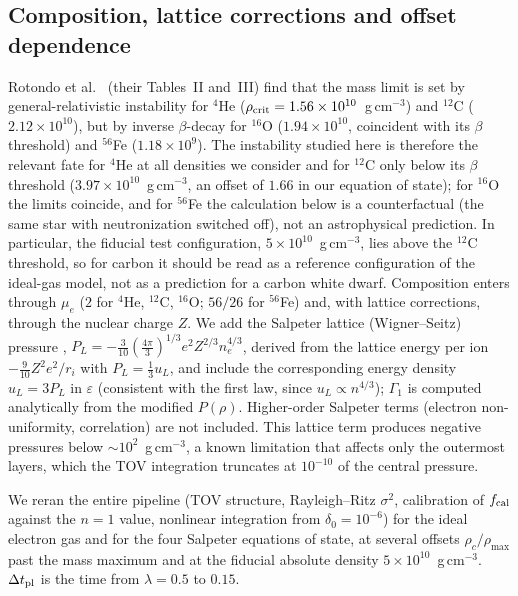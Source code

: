 \documentclass[11pt]{article}
\begin{document}
\subsection{Composition, lattice corrections and offset dependence}
\label{sec:composition}

Rotondo et al.\ \citep{RotondoRRX2011} (their Tables~II and~III) find that the mass limit is set by general-relativistic instability for $^{4}$He ($\rho_{\rm crit}=1.56\times10^{10}$~g\,cm$^{-3}$) and $^{12}$C ($2.12\times10^{10}$), but by inverse $\beta$-decay for $^{16}$O ($1.94\times10^{10}$, coincident with its $\beta$ threshold) and $^{56}$Fe ($1.18\times10^{9}$). The instability studied here is therefore the relevant fate for $^{4}$He at all densities we consider and for $^{12}$C only below its $\beta$ threshold ($3.97\times10^{10}$~g\,cm$^{-3}$, an offset of $1.66$ in our equation of state); for $^{16}$O the limits coincide, and for $^{56}$Fe the calculation below is a counterfactual (the same star with neutronization switched off), not an astrophysical prediction. In particular, the fiducial test configuration, $5\times10^{10}$~g\,cm$^{-3}$, lies above the $^{12}$C threshold, so for carbon it should be read as a reference configuration of the ideal-gas model, not as a prediction for a carbon white dwarf. Composition enters through $\mu_e$ ($2$ for $^{4}$He, $^{12}$C, $^{16}$O; $56/26$ for $^{56}$Fe) and, with lattice corrections, through the nuclear charge $Z$. We add the Salpeter lattice (Wigner--Seitz) pressure \citep{Salpeter1961}, $P_L=-\tfrac{3}{10}\left(\tfrac{4\pi}{3}\right)^{1/3}e^2Z^{2/3}n_e^{4/3}$, derived from the lattice energy per ion $-\tfrac{9}{10}Z^2e^2/r_i$ with $P_L=\tfrac13u_L$, and include the corresponding energy density $u_L=3P_L$ in $\varepsilon$ (consistent with the first law, since $u_L\propto n^{4/3}$); $\Gamma_1$ is computed analytically from the modified $P(\rho)$. Higher-order Salpeter terms (electron non-uniformity, correlation) are not included. This lattice term produces negative pressures below $\sim10^2$~g\,cm$^{-3}$, a known limitation \citep{RotondoRRX2011} that affects only the outermost layers, which the TOV integration truncates at $10^{-10}$ of the central pressure.

We reran the entire pipeline (TOV structure, Rayleigh--Ritz $\sigma^2$, calibration of $f_{\rm cal}$ against the $n=1$ value, nonlinear integration from $\delta_0=10^{-6}$) for the ideal electron gas and for the four Salpeter equations of state, at several offsets $\rho_c/\rho_{\max}$ past the mass maximum and at the fiducial absolute density $5\times10^{10}$~g\,cm$^{-3}$. $\Delta t_{\rm pl}$ is the time from $\lambda=0.5$ to $0.15$.
\end{document}
